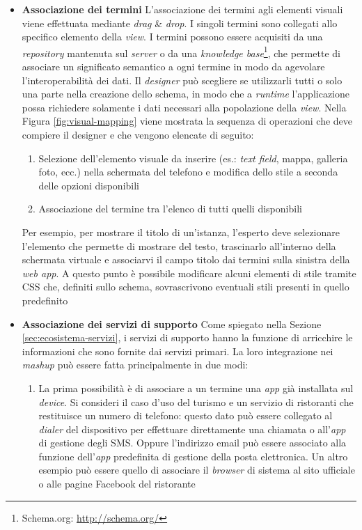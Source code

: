 \begin{itemize}
	\item \textbf{Associazione dei termini} 
	L'associazione dei termini agli elementi visuali viene effettuata mediante \emph{drag} \& \emph{drop}. I singoli termini sono collegati allo specifico elemento della \emph{view}. 
	I termini possono essere acquisiti da una \emph{repository} mantenuta sul \emph{server} o da una \emph{knowledge base}\footnote{Schema.org: \url{http://schema.org/}}, che permette di associare un significato semantico a ogni termine in modo da agevolare l'interoperabilità dei dati. Il \emph{designer} può scegliere se utilizzarli tutti o solo una parte nella creazione dello schema, in modo che a \emph{runtime} l'applicazione possa richiedere solamente i dati necessari alla popolazione della \emph{view}.
	Nella Figura \ref{fig:visual-mapping} viene mostrata la sequenza di operazioni che deve compiere il designer e che vengono elencate di seguito:
	\begin{enumerate}
		\item
		Selezione dell'elemento visuale da inserire (es.: \emph{text field}, mappa, galleria foto, ecc.) nella schermata del telefono e modifica dello stile a seconda delle opzioni disponibili
		\item
		Associazione del termine tra l'elenco di tutti quelli disponibili
	\end{enumerate}
	Per esempio, per mostrare il titolo di un'istanza, l'esperto deve selezionare l'elemento che permette di mostrare del testo, trascinarlo all'interno della schermata virtuale e associarvi il campo titolo dai termini sulla sinistra della \emph{web app}. A questo punto è possibile modificare alcuni elementi di stile tramite CSS che, definiti sullo schema, sovrascrivono eventuali stili presenti in quello predefinito
	\item \textbf{Associazione dei servizi di supporto}
	Come spiegato nella Sezione \ref{sec:ecosistema-servizi}, i servizi di supporto hanno la funzione di arricchire le informazioni che sono fornite dai servizi primari. La loro integrazione nei \emph{mashup} può essere fatta principalmente in due modi:
	\begin{enumerate}
		\item
		La prima possibilità è di associare a un termine una \emph{app} già installata sul \emph{device}. Si consideri il caso d'uso del turismo e un servizio di ristoranti che restituisce un numero di telefono: questo dato può essere collegato al \emph{dialer} del dispositivo per effettuare direttamente una chiamata o all'\emph{app} di gestione degli SMS. Oppure l'indirizzo email può essere associato alla funzione  dell'\emph{app} predefinita di gestione della posta elettronica. Un altro esempio può essere quello di associare il \emph{browser} di sistema al sito ufficiale o alle pagine Facebook del ristorante

\end{enumerate}
\end{itemize}
